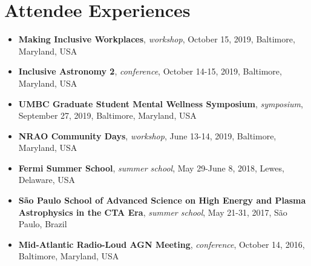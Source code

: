%
%
%

\section{\texorpdfstring{\color{Blue}Attendee Experiences}{Attendee Experiences}}

\begin{itemize}
    \item \textbf{Making Inclusive Workplaces}, \emph{workshop}, October 15, 2019, Baltimore, Maryland, USA
    \item \textbf{Inclusive Astronomy 2}, \emph{conference}, October 14-15, 2019, Baltimore, Maryland, USA
    \item \textbf{UMBC Graduate Student Mental Wellness Symposium}, \emph{symposium}, September 27, 2019, Baltimore, Maryland, USA
    \item \textbf{NRAO Community Days}, \emph{workshop}, June 13-14, 2019, Baltimore, Maryland, USA
    \item \textbf{Fermi Summer School}, \emph{summer school}, May 29-June 8, 2018, Lewes, Delaware, USA
    \item \textbf{S\~{a}o Paulo School of Advanced Science on High Energy and Plasma Astrophysics in the CTA Era}, \emph{summer school}, May 21-31, 2017, S\~{a}o Paulo, Brazil
    \item \textbf{Mid-Atlantic Radio-Loud AGN Meeting}, \emph{conference}, October 14, 2016, Baltimore, Maryland, USA

\end{itemize}
